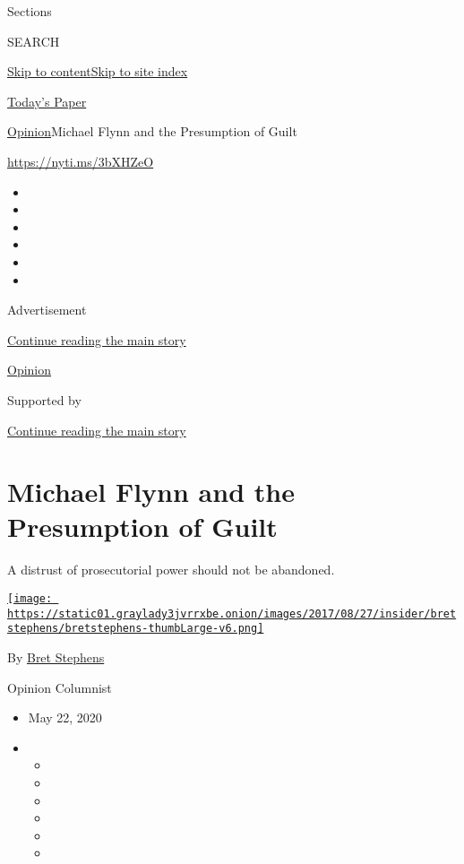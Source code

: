 Sections

SEARCH

\protect\hyperlink{site-content}{Skip to
content}\protect\hyperlink{site-index}{Skip to site index}

\href{https://myaccount.nytimes3xbfgragh.onion/auth/login?response_type=cookie\&client_id=vi}{}

\href{https://www.nytimes3xbfgragh.onion/section/todayspaper}{Today's
Paper}

\href{/section/opinion}{Opinion}\textbar{}Michael Flynn and the
Presumption of Guilt

\url{https://nyti.ms/3bXHZeO}

\begin{itemize}
\item
\item
\item
\item
\item
\item
\end{itemize}

Advertisement

\protect\hyperlink{after-top}{Continue reading the main story}

\href{/section/opinion}{Opinion}

Supported by

\protect\hyperlink{after-sponsor}{Continue reading the main story}

\hypertarget{michael-flynn-and-the-presumption-of-guilt}{%
\section{Michael Flynn and the Presumption of
Guilt}\label{michael-flynn-and-the-presumption-of-guilt}}

A distrust of prosecutorial power should not be abandoned.

\href{https://www.nytimes3xbfgragh.onion/by/bret-stephens}{\texttt{[image: https://static01.graylady3jvrrxbe.onion/images/2017/08/27/insider/bretstephens/bretstephens-thumbLarge-v6.png]}}

By \href{https://www.nytimes3xbfgragh.onion/by/bret-stephens}{Bret
Stephens}

Opinion Columnist

\begin{itemize}
\item
  May 22, 2020
\item
  \begin{itemize}
  \item
  \item
  \item
  \item
  \item
  \item
  \end{itemize}
\end{itemize}

